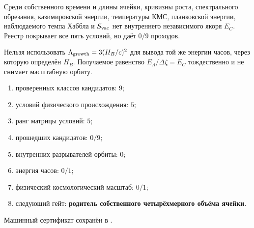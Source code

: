 \begin{theorem}
Среди собственного времени и длины ячейки, кривизны роста, спектрального
обрезания, казимировской энергии, температуры КМС, планковской энергии,
наблюдаемого темпа Хаббла и $S_{\rm vac}$ нет внутреннего независимого
якоря $E_C$. Реестр покрывает все пять условий, но даёт $0/9$ проходов.
\end{theorem}

\begin{nogocriterion}
Нельзя использовать $\Lambda_{\rm growth}=3(H_B/c)^2$ для вывода той же
энергии часов, через которую определён $H_B$. Получаемое равенство
$E_\Lambda/\Delta\zeta=E_C$ тождественно и не снимает масштабную орбиту.
\end{nogocriterion}

\begin{protocol}\begin{enumerate}
\item проверенных классов кандидатов: \textbf{$9$};
\item условий физического происхождения: \textbf{$5$};
\item ранг матрицы условий: \textbf{$5$};
\item прошедших кандидатов: \textbf{$0/9$};
\item внутренних разрывателей орбиты: \textbf{$0$};
\item энергия часов: \textbf{$0/1$};
\item физический космологический масштаб: \textbf{$0/1$};
\item следующий гейт: \textbf{родитель собственного четырёхмерного объёма
ячейки}.
\end{enumerate}\end{protocol}

Машинный сертификат сохранён в
.